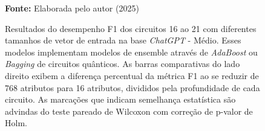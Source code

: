\begin{figure}
\caption{Resultados do desempenho F1 dos circuitos 16 ao 21 com diferentes tamanhos de vetor de entrada na base \textit{ChatGPT} - Médio. Esses modelos implementam modelos de ensemble através de \textit{AdaBoost} ou \textit{Bagging} de circuitos quânticos. As barras comparativas do lado direito exibem a diferença percentual da métrica F1 ao se reduzir de 768 atributos para 16 atributos, divididos pela profundidade de cada circuito. As marcações que indicam semelhança estatística são advindas do teste pareado de Wilcoxon com correção de p-valor de Holm.}
\label{fig:n_features:medium:g6}
     \centering
    \centering
      \par\medskip\ABNTEXfontereduzida\selectfont\textbf{Fonte:} Elaborada pelo autor (2025) \par\medskip
\end{figure}